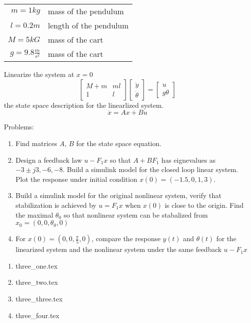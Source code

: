 {  \begin{tabular}{r|l}
    $m=1kg$ & mass of the pendulum\\
    $l=0.2m$ & length of the pendulum\\
    $M = 5kG$ & mass of the cart\\
    $g = 9.8\frac m {s^2}$ & mass of the cart
  \end{tabular}
  
  Linearize the system at $x=0$
  \begin{equation}
    \begin{bmatrix}
      M+m & ml \\
      1 & l
    \end{bmatrix}
    \begin{bmatrix}
      \ddot y\\
      \ddot \theta
    \end{bmatrix} =
    \begin{bmatrix}
      u \\
      g\theta
    \end{bmatrix}
  \end{equation}
  the state space description for the linearlized system.
  \begin{equation}
    \dot x = Ax + Bu
  \end{equation}

  Problems:
  \begin{enumerate}[\arabic*.]
  \item Find matrices $A$, $B$ for the state space equation.
  \item Design a feedback law $u-F_1x$  so that $A+BF_1$ has eignevalues as $-3\pm j3, -6, -8$. Build a simulink
    model for the closed loop linear system. Plot the response under initial condition
    $x(0) = (-1.5, 0, 1, 3)$.
  \item Build a simulink model for the original nonlinear system, verify that stabilization is achieved by
    $u=F_1x$ when $x(0)$ is close to the origin. Find the maximal $\theta_0$ so that nonlinear system can be
    stabalized from $x_0 = (0, 0, \theta_0,0)$
  \item For $x(0)=(0,0, \frac{\pi} 5,0)$, compare the response $y(t)$ and
    $\theta(t)$ for the linearized system and the nonlinear system under the same feedback $u - F_1x$
  \end{enumerate}
}{%
  \begin{enumerate}[\arabic*.]
  \item {three_one.tex}
  \item {three_two.tex}
  \item {three_three.tex}
  \item {three_four.tex}
  \end{enumerate}
}
